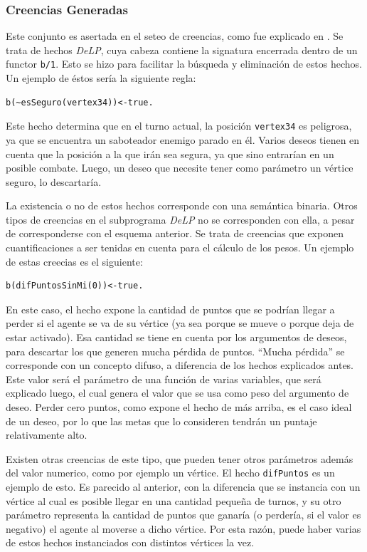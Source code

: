 \documentclass[oneside]{book}
\theoremstyle{definition}
\theoremstyle{example}
\begin{document}
\subsubsection{Creencias Generadas}

Este conjunto es asertada en el seteo de creencias, como fue explicado en %
. Se trata de hechos \textit{DeLP}, cuya cabeza contiene la signatura encerrada dentro
de un functor \texttt{b/1}. Esto se hizo para facilitar la búsqueda y eliminación de
estos hechos. Un ejemplo de éstos sería la siguiente regla:

\begin{verbatim}
b(~esSeguro(vertex34))<-true.
\end{verbatim}

Este hecho determina que en el turno actual, la posición \texttt{vertex34} es peligrosa,
ya que se encuentra un saboteador enemigo parado en él. Varios deseos tienen en cuenta
que la posición a la que irán sea segura, ya que sino entrarían en un posible combate.
Luego, un deseo que necesite tener como parámetro un vértice seguro, lo descartaría.

La existencia o no de estos hechos corresponde con una semántica binaria. Otros tipos de
creencias en el subprograma \textit{DeLP} no se corresponden con ella, a pesar de corresponderse
con el esquema anterior. Se trata de creencias que exponen cuantificaciones a ser 
tenidas en cuenta para el cálculo de los pesos. Un ejemplo de estas creecias es el 
siguiente:

\begin{verbatim}
b(difPuntosSinMi(0))<-true.
\end{verbatim}

En este caso, el hecho expone la cantidad de puntos que se podrían llegar a perder si el
agente se va de su vértice (ya sea porque se mueve o porque deja de estar activado). Esa
cantidad se tiene en cuenta por los argumentos de deseos, para descartar los que generen
mucha pérdida de puntos. ``Mucha pérdida'' se corresponde con un concepto difuso, a
diferencia de los hechos explicados antes. Este valor será el parámetro de una función
de varias variables, que será explicado luego, el cual genera el valor que se usa como
peso del argumento de deseo. Perder cero puntos, como expone el hecho de más arriba, es el
caso ideal de un deseo, por lo que las metas que lo consideren tendrán un puntaje
relativamente alto.

Existen otras creencias de este tipo, que pueden tener otros parámetros además del valor
numerico, como por ejemplo un vértice. El hecho \texttt{difPuntos} es un ejemplo de esto.
Es parecido al anterior, con la diferencia que se instancia con un vértice al cual es
posible llegar en una cantidad pequeña de turnos, y su otro parámetro representa la
cantidad de puntos que ganaría (o perdería, si el valor es negativo) el agente al moverse
a dicho vértice. Por esta razón, puede haber varias de estos hechos instanciados con
distintos vértices la vez.
\end{document}
